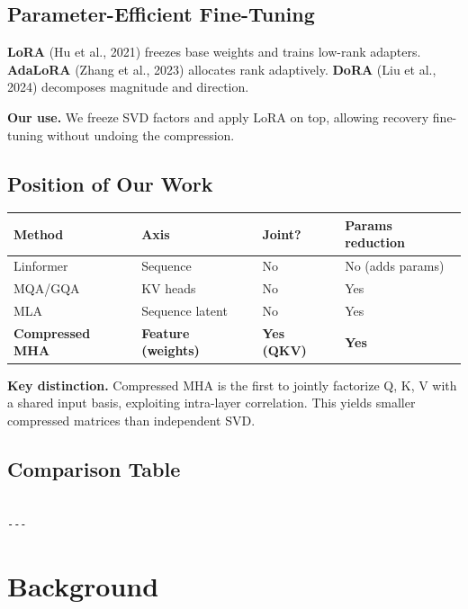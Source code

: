 \subsection{Parameter-Efficient Fine-Tuning}

\textbf{LoRA} (Hu et al., 2021) freezes base weights and trains low-rank adapters. 
\textbf{AdaLoRA} (Zhang et al., 2023) allocates rank adaptively. \textbf{DoRA} (Liu 
et al., 2024) decomposes magnitude and direction.

\textbf{Our use.} We freeze SVD factors and apply LoRA on top, allowing 
recovery fine-tuning without undoing the compression.

\subsection{Position of Our Work}

\begin{table}[H]
\centering
\small
\begin{tabular}{llll}
\toprule
\textbf{Method} & \textbf{Axis} & \textbf{Joint?} & \textbf{Params reduction} \\
\midrule
Linformer & Sequence & No & No (adds params) \\
MQA/GQA & KV heads & No & Yes \\
MLA & Sequence latent & No & Yes \\
\textbf{Compressed MHA} & \textbf{Feature (weights)} & \textbf{Yes (QKV)} & \textbf{Yes} \\
\bottomrule
\end{tabular}
\end{table}

\textbf{Key distinction.} Compressed MHA is the first to jointly factorize Q, K, V 
with a shared input basis, exploiting intra-layer correlation. This yields 
smaller compressed matrices than independent SVD.



\subsection{Comparison Table}

\begin{lstlisting}

---
\end{lstlisting}

\section{Background}

